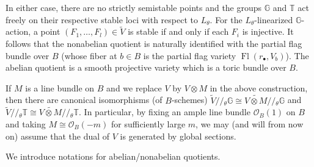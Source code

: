 \documentclass[a4paper,12pt]{amsart}
\numberwithin{equation}{section}
\theoremstyle{definition}
\newcommand{\G}{\mathbb{G}}
\newcommand{\T}{\mathbb{T}}
\newcommand{\Fl}{\operatorname{Fl}}
\begin{document}
In either case, there are no strictly semistable points and the groups $\G$ and $\T$ act freely on their respective stable loci with respect to $L_\theta$.
For the $L_\theta$-linearized $\G$-action, a point $(F_1,\dots,F_l)\in\widetilde{V}$ is stable if and only if each $F_i$ is injective. It follows that
the nonabelian quotient is naturally identified with the partial flag bundle over $B$ (whose fiber at $b\in B$ is the partial flag variety $\Fl(r_\bullet,V_b)$). The abelian quotient is a smooth projective variety which is a toric bundle over $B$. 

If $M$ is a line bundle on $B$ and we replace $V$ by $V\otimes M$ in the above construction, then there are canonical isomorphisms (of $B$-schemes) $\widetilde{V}/\!/\!_{\theta}\G\cong \widetilde{V\otimes M}/\!/\!_{\theta}\G$ and $\widetilde{V}/\!/\!_{\theta}\T\cong \widetilde{V\otimes M}/\!/\!_{\theta}\T$. In particular, by fixing an ample line bundle $\mathcal{O}_B(1)$ on $B$ and taking $M\cong\mathcal{O}_B(-m)$ for sufficiently large $m$, we may (and will from now on) assume that the dual of $V$ is generated by global sections.



We introduce notations for abelian/nonabelian quotients.
\end{document}
